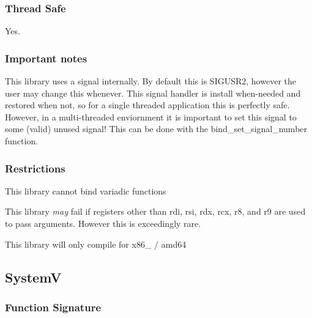\subsubsection*{Thread Safe}

Yes.

\subsubsection*{Important notes}


\begin{DoxyEnumerate}
\item This library uses a signal internally. By default this is {\ttfamily S\+I\+G\+U\+S\+R2}, however the user may change this whenever. This signal handler is install when-\/needed and restored when not, so for a single threaded application this is perfectly safe. However, in a multi-\/threaded enviornment it is important to set this signal to some (valid) unused signal! This can be done with the {\ttfamily bind\+\_\+set\+\_\+signal\+\_\+number} function.
\end{DoxyEnumerate}

\subsubsection*{Restrictions}


\begin{DoxyEnumerate}
\item This library cannot bind variadic functions
\end{DoxyEnumerate}
\begin{DoxyEnumerate}
\item This library {\itshape may} fail if registers other than {\ttfamily rdi}, {\ttfamily rsi,} {\ttfamily rdx}, {\ttfamily rcx}, {\ttfamily r8}, and {\ttfamily r9} are used to pass arguments. However this is exceedingly rare.
\end{DoxyEnumerate}
\begin{DoxyEnumerate}
\item This library will only compile for {\ttfamily x86\+\_} / {\ttfamily amd64}
\end{DoxyEnumerate}

\subsection*{SystemV}

\subsubsection*{Function Signature}

